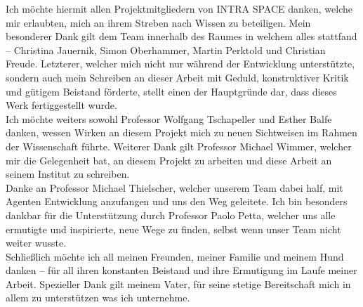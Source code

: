 \documentclass[draft,final]{vutinfth} %
\begin{document}
\frontmatter %

\glsunsetall


\glsresetall

\addstatementpage

\begin{danksagung*}

Ich möchte hiermit allen Projektmitgliedern von INTRA SPACE danken, welche mir erlaubten, mich an ihrem Streben nach Wissen zu beteiligen.
Mein besonderer Dank gilt dem Team innerhalb des Raumes in welchem alles stattfand – Christina Jauernik, Simon Oberhammer, Martin Perktold und Christian Freude. 
Letzterer, welcher mich nicht nur während der Entwicklung unterstützte, sondern auch mein Schreiben an dieser Arbeit mit Geduld, konstruktiver Kritik und gütigem Beistand förderte, stellt einen der Hauptgründe dar, dass dieses Werk fertiggestellt wurde. \\
Ich möchte weiters sowohl Professor Wolfgang Tschapeller und Esther Balfe danken, wessen Wirken an diesem Projekt mich zu neuen Sichtweisen im Rahmen der Wissenschaft führte. 
Weiterer Dank gilt Professor Michael Wimmer, welcher mir die Gelegenheit bat, an diesem Projekt zu arbeiten und diese Arbeit an seinem Institut zu schreiben. \\
Danke an Professor Michael Thielscher, welcher unserem Team dabei half, mit Agenten Entwicklung anzufangen und uns den Weg geleitete. 
Ich bin besonders dankbar für die Unterstützung durch Professor Paolo Petta, welcher uns alle ermutigte und inspirierte, neue Wege zu finden, selbst wenn unser Team nicht weiter wusste. \\
Schließlich möchte ich all meinen Freunden, meiner Familie und meinem Hund danken – für all ihren konstanten Beistand und ihre Ermutigung im Laufe meiner Arbeit.
Spezieller Dank gilt meinem Vater, für seine stetige Bereitschaft mich in allem zu unterstützen was ich unternehme.

\end{danksagung*}
\end{document}
